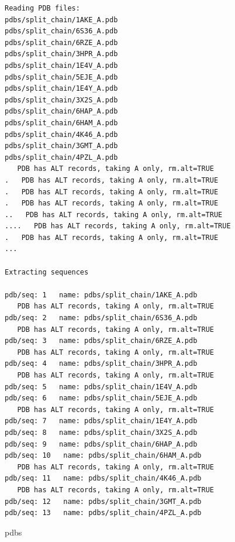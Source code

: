 \documentclass[
  letterpaper,
  DIV=11,
  numbers=noendperiod]{scrartcl}
\newenvironment{Shaded}{\begin{snugshade}}{\end{snugshade}}
\newcommand{\NormalTok}[1]{\textcolor[rgb]{0.00,0.23,0.31}{#1}}
\begin{document}
\begin{verbatim}
Reading PDB files:
pdbs/split_chain/1AKE_A.pdb
pdbs/split_chain/6S36_A.pdb
pdbs/split_chain/6RZE_A.pdb
pdbs/split_chain/3HPR_A.pdb
pdbs/split_chain/1E4V_A.pdb
pdbs/split_chain/5EJE_A.pdb
pdbs/split_chain/1E4Y_A.pdb
pdbs/split_chain/3X2S_A.pdb
pdbs/split_chain/6HAP_A.pdb
pdbs/split_chain/6HAM_A.pdb
pdbs/split_chain/4K46_A.pdb
pdbs/split_chain/3GMT_A.pdb
pdbs/split_chain/4PZL_A.pdb
   PDB has ALT records, taking A only, rm.alt=TRUE
.   PDB has ALT records, taking A only, rm.alt=TRUE
.   PDB has ALT records, taking A only, rm.alt=TRUE
.   PDB has ALT records, taking A only, rm.alt=TRUE
..   PDB has ALT records, taking A only, rm.alt=TRUE
....   PDB has ALT records, taking A only, rm.alt=TRUE
.   PDB has ALT records, taking A only, rm.alt=TRUE
...

Extracting sequences

pdb/seq: 1   name: pdbs/split_chain/1AKE_A.pdb 
   PDB has ALT records, taking A only, rm.alt=TRUE
pdb/seq: 2   name: pdbs/split_chain/6S36_A.pdb 
   PDB has ALT records, taking A only, rm.alt=TRUE
pdb/seq: 3   name: pdbs/split_chain/6RZE_A.pdb 
   PDB has ALT records, taking A only, rm.alt=TRUE
pdb/seq: 4   name: pdbs/split_chain/3HPR_A.pdb 
   PDB has ALT records, taking A only, rm.alt=TRUE
pdb/seq: 5   name: pdbs/split_chain/1E4V_A.pdb 
pdb/seq: 6   name: pdbs/split_chain/5EJE_A.pdb 
   PDB has ALT records, taking A only, rm.alt=TRUE
pdb/seq: 7   name: pdbs/split_chain/1E4Y_A.pdb 
pdb/seq: 8   name: pdbs/split_chain/3X2S_A.pdb 
pdb/seq: 9   name: pdbs/split_chain/6HAP_A.pdb 
pdb/seq: 10   name: pdbs/split_chain/6HAM_A.pdb 
   PDB has ALT records, taking A only, rm.alt=TRUE
pdb/seq: 11   name: pdbs/split_chain/4K46_A.pdb 
   PDB has ALT records, taking A only, rm.alt=TRUE
pdb/seq: 12   name: pdbs/split_chain/3GMT_A.pdb 
pdb/seq: 13   name: pdbs/split_chain/4PZL_A.pdb 
\end{verbatim}

\begin{Shaded}
\begin{Highlighting}[]
\NormalTok{pdbs}
\end{Highlighting}
\end{Shaded}
\end{document}
